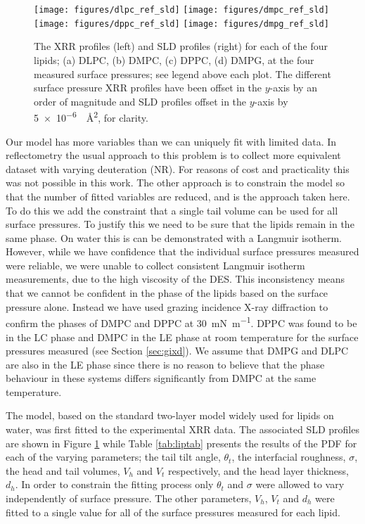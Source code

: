 \documentclass[amsmath,amssymb,twocolumn]{revtex4-1}
\begin{document}
%
\begin{figure}
	\centering
  \texttt{[image: figures/dlpc\_ref\_sld]}
	\texttt{[image: figures/dmpc\_ref\_sld]}
	\texttt{[image: figures/dppc\_ref\_sld]}
	\texttt{[image: figures/dmpg\_ref\_sld]}
	\caption{\small The XRR profiles (left) and SLD profiles (right) for each
  of the four lipids; (a) DLPC, (b) DMPC, (c) DPPC, (d) DMPG, at the four
  measured surface pressures; see legend above each plot. The different
  surface pressure XRR profiles have been offset in the $y$-axis by an order
  of magnitude and SLD profiles offset in the $y$-axis by
  \SI{5e-6}{\per\square\angstrom}, for clarity.}
	\label{fig:lipids}
\end{figure}
%
Our model has more variables than we can uniquely fit with limited data.
In reflectometry the usual approach to this problem is to collect more
equivalent dataset with varying deuteration (NR). For reasons of cost and
practicality this was not possible in this work.
The other approach is to constrain the model so that the number of fitted
variables are reduced, and is the approach taken here.
To do this we add the constraint that a single tail volume can be used for
all surface pressures. To justify this we need to be sure that the lipids
remain in the same phase. On water this is can be demonstrated with a
Langmuir isotherm.
However, while we have confidence that the individual surface pressures
measured were reliable, we were unable to collect consistent Langmuir
isotherm measurements, due to the high viscosity of the DES.
This inconsistency means that we cannot be confident in the phase of the
lipids based on the surface pressure alone.
Instead we have used grazing incidence X-ray diffraction to confirm the
phases of DMPC and DPPC at \SI{30}{\milli\newton\per\meter}.
DPPC was found to be in the LC phase and DMPC in the LE phase at room
temperature for the surface pressures measured (see Section \ref{sec:gixd}).
We assume that DMPG and DLPC are also in the LE phase since there is no
reason to believe that the phase behaviour in these systems differs
significantly from DMPC at the same temperature.

The model, based on the standard two-layer model widely used for lipids on
water, was first fitted to the experimental XRR data.
The associated SLD profiles are shown in Figure \ref{fig:lipids} while
Table \ref{tab:liptab} presents the results of the PDF for each of the
varying parameters; the tail tilt angle, $\theta_t$, the interfacial
roughness, $\sigma$, the head and tail volumes, $V_h$ and $V_t$ respectively,
and the head layer thickness, $d_h$.
In order to constrain the fitting process only $\theta_t$ and $\sigma$ were
allowed to vary independently of surface pressure. The other parameters,
$V_h$, $V_t$ and $d_h$ were fitted to a single value for all of the surface
pressures measured for each lipid.
\end{document}
